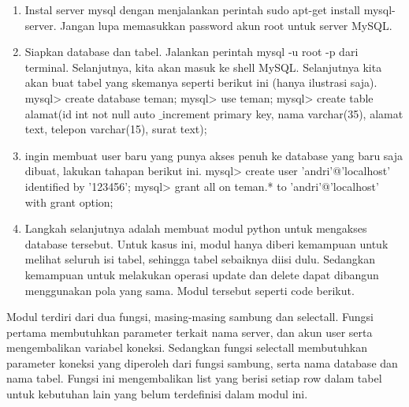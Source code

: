 \begin{enumerate}
\item Instal server mysql dengan menjalankan perintah sudo apt-get install mysql-server. Jangan lupa memasukkan password akun root untuk server MySQL. 
 
\item Siapkan database dan tabel. Jalankan perintah mysql -u root -p dari terminal. Selanjutnya, kita akan masuk ke shell MySQL. Selanjutnya kita akan buat tabel yang skemanya seperti berikut ini (hanya ilustrasi saja). 
mysql> create database teman; 
mysql> use teman; \hspace*{1.69in}  
mysql> create table alamat(id int not null auto $  \_  $increment primary key, nama varchar(35), alamat text, telepon varchar(15), surat text); 
\vspace{12pt}

\item  ingin membuat user baru yang punya akses penuh ke database yang baru saja dibuat, lakukan tahapan berikut ini. 
mysql> create user 'andri'@'localhost' identified by '123456'; 
mysql> grant all on teman.* to 'andri'@'localhost' with grant option; 

\item Langkah selanjutnya adalah membuat modul python untuk mengakses database tersebut. Untuk kasus ini, modul hanya diberi kemampuan untuk melihat seluruh isi tabel, sehingga tabel sebaiknya diisi dulu. Sedangkan kemampuan untuk melakukan operasi update dan delete dapat dibangun menggunakan pola yang sama. Modul tersebut seperti code berikut. 
\end{enumerate}

\vspace{12pt}
Modul terdiri dari dua fungsi, masing-masing sambung dan selectall. Fungsi pertama membutuhkan parameter terkait nama server, dan akun user serta mengembalikan variabel koneksi. Sedangkan fungsi selectall membutuhkan parameter koneksi yang diperoleh dari fungsi sambung, serta nama database dan nama tabel. Fungsi ini mengembalikan list yang berisi setiap row dalam tabel untuk kebutuhan lain yang belum terdefinisi dalam modul ini. 
\vspace{12pt}

